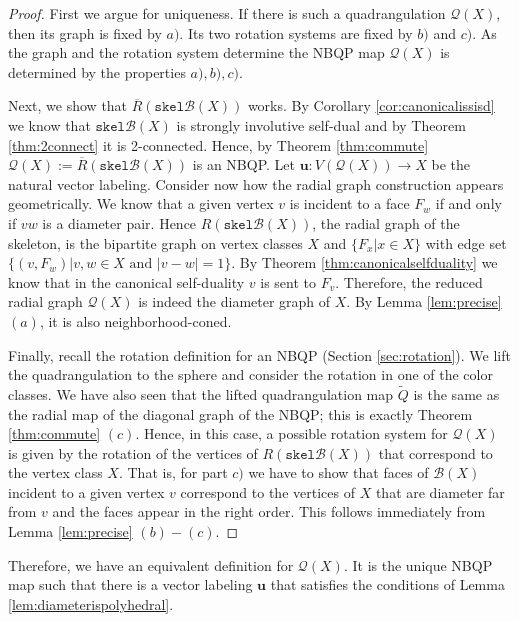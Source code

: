 \documentclass{article}
\newcommand{\vu}[0]{\mathbf{u}}
\newcommand{\Bc}[0]{\mathcal{B}}
\newcommand{\skel}[0]{\mathtt{skel}}
\newcommand{\qt}{\mathcal{Q}}
\begin{document}
\begin{proof}
    First we argue for uniqueness. If there is such a quadrangulation $\qt(X)$, then its graph is fixed by $a)$. Its two rotation systems are fixed by $b)$ and $c)$. As the graph and the rotation system determine the NBQP map $\qt(X)$ is determined by the properties $a),b),c)$.
    
    Next, we show that $\overline{R}(\skel\Bc(X))$ works. By Corollary  \ref{cor:canonicalissisd} we know that $\skel\Bc(X)$ is strongly involutive self-dual and by Theorem \ref{thm:2connect} it is 2-connected. Hence, by Theorem \ref{thm:commute} $\qt(X):=\overline R(\skel\Bc(X))$ is an NBQP. Let $\vu:V(\qt(X))\rightarrow X$ be the natural vector labeling. Consider now how the radial graph construction appears geometrically. We know that a given vertex $v$ is incident to a face $F_w$ if and only if $vw$ is a diameter pair. Hence $R(\skel\Bc(X))$, the radial graph of the skeleton, is the bipartite graph on vertex classes $X$ and $\{F_x|x\in X\}$ with edge set $\{(v,F_w) | v,w\in X \text{ and }|v-w|=1 \}$. By Theorem \ref{thm:canonicalselfduality} we know that in the canonical self-duality $v$ is sent to $F_v$. Therefore, the reduced radial graph $\qt(X)$ is indeed the diameter graph of $X$. By Lemma \ref{lem:precise} $(a)$, it is also neighborhood-coned.

    Finally, recall the rotation definition for an NBQP (Section \ref{sec:rotation}). We lift the quadrangulation to the sphere and consider the rotation in one of the color classes. We have also seen that the lifted quadrangulation map $\widetilde Q$ is the same as the radial map of the diagonal graph of the NBQP; this is exactly Theorem \ref{thm:commute} $(c)$.  Hence, in this case, a possible rotation system for $\qt(X)$ is given by the rotation of the vertices of $R(\skel\Bc(X))$ that correspond to the vertex class $X$. That is, for part $c)$ we have to show that faces of $\Bc(X)$ incident to a given vertex $v$ correspond to the vertices of $X$ that are diameter far from $v$ and the faces appear in the right order. This follows immediately from Lemma \ref{lem:precise} $(b)-(c)$.
    
\end{proof}

Therefore, we have an equivalent definition for $\qt(X)$. It is the unique NBQP map such that there is a vector labeling $\vu$ that satisfies the conditions of Lemma \ref{lem:diameterispolyhedral}. 
\end{document}
